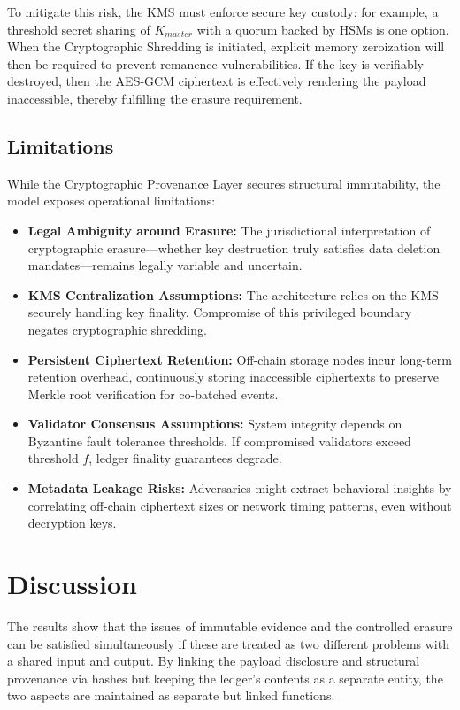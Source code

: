 \documentclass[conference]{IEEEtran}
\begin{document}
To mitigate this risk, the KMS must enforce secure key custody; for example, a threshold secret sharing of $K_{master}$ with a quorum backed by HSMs is one option. When the Cryptographic Shredding is initiated, explicit memory zeroization will then be required to prevent remanence vulnerabilities. If the key is verifiably destroyed, then the AES-GCM ciphertext is effectively rendering the payload inaccessible, thereby fulfilling the erasure requirement.

\subsection{Limitations}
While the Cryptographic Provenance Layer secures structural immutability, the model exposes operational limitations:
\begin{itemize}
    \item \textbf{Legal Ambiguity around Erasure:} The jurisdictional interpretation of cryptographic erasure---whether key destruction truly satisfies data deletion mandates---remains legally variable and uncertain.
    \item \textbf{KMS Centralization Assumptions:} The architecture relies on the KMS securely handling key finality. Compromise of this privileged boundary negates cryptographic shredding.
    \item \textbf{Persistent Ciphertext Retention:} Off-chain storage nodes incur long-term retention overhead, continuously storing inaccessible ciphertexts to preserve Merkle root verification for co-batched events.
    \item \textbf{Validator Consensus Assumptions:} System integrity depends on Byzantine fault tolerance thresholds. If compromised validators exceed threshold $f$, ledger finality guarantees degrade.
    \item \textbf{Metadata Leakage Risks:} Adversaries might extract behavioral insights by correlating off-chain ciphertext sizes or network timing patterns, even without decryption keys.
\end{itemize}

\section{Discussion}
The results show that the issues of immutable evidence and the controlled erasure can be satisfied simultaneously if these are treated as two different problems with a shared input and output. By linking the payload disclosure and structural provenance via hashes but keeping the ledger’s contents as a separate entity, the two aspects are maintained as separate but linked functions.
\end{document}
